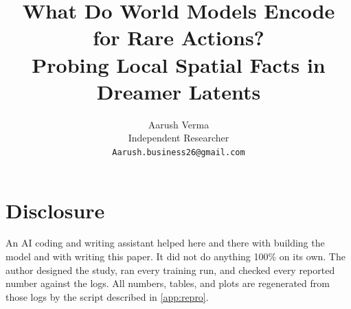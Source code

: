 \documentclass[10pt]{article}
\title{What Do World Models Encode for Rare Actions?\\Probing Local Spatial Facts in Dreamer Latents}
\author{
  Aarush Verma\\
  Independent Researcher\\
  \texttt{Aarush.business26@gmail.com}
}
\date{}
\begin{document}
\maketitle











\section*{Disclosure}
An AI coding and writing assistant helped here and there with building the model and with writing this paper. It did not do anything 100\% on its own. The author designed the study, ran every training run, and checked every reported number against the logs. All numbers, tables, and plots are regenerated from those logs by the script described in \cref{app:repro}.




\clearpage
\appendix

\end{document}
